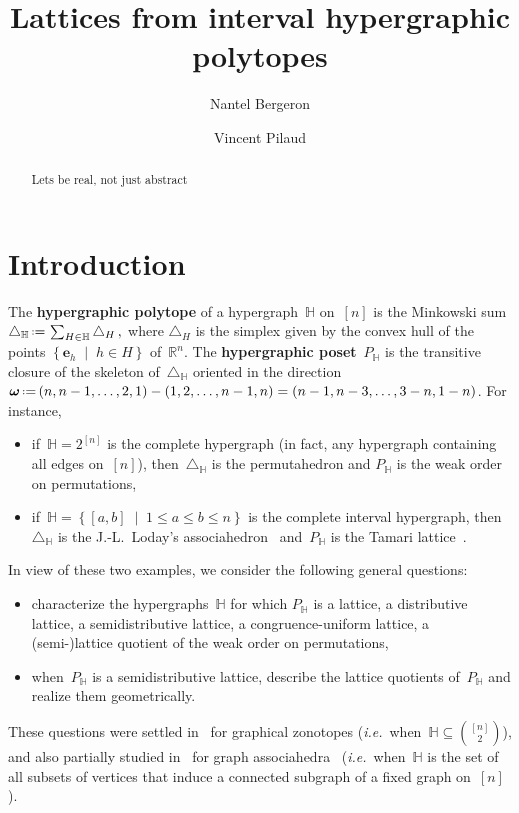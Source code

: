 \documentclass[reqno]{amsart}
\title{Lattices from interval hypergraphic polytopes}
\author[N.~Bergeron]{Nantel Bergeron}
\author{Vincent Pilaud}
\theoremstyle{definition}
\newcommand{\R}{\mathbb{R}} %
\renewcommand{\b}[1]{\boldsymbol{#1}} %
\newcommand{\set}[2]{\left\{ #1 \;\middle|\; #2 \right\}} %
\newcommand{\eqdef}{\mbox{\,\raisebox{0.2ex}{\scriptsize\ensuremath{\mathrm:}}\ensuremath{=}\,}} %
\newcommand{\simplex}{\triangle} %
\newcommand{\ie}{\textit{i.e.}~} %
\newcommand{\defn}[1]{\textbf{\textsf{\color{PineGreen} #1}}} %
\newcommand{\HH}{\mathbb H}  %
\begin{document}
\begin{abstract}
	Lets be real, not just abstract
\end{abstract}

\vspace*{-.8cm}

\maketitle

\tableofcontents


\section{Introduction}
\label{sec:introduction}

The \defn{hypergraphic polytope} of a hypergraph~$\HH$ on~$[n]$ is the Minkowski sum
\(
\simplex_\HH \eqdef \sum_{H\in \HH} \simplex_H\,,
\)
where $\simplex_H$ is the simplex given by the convex hull of the points $\set{\b{e}_h}{h \in H}$ of~$\R^n$.
The \defn{hypergraphic poset}~$P_\HH$ is the transitive closure of the skeleton of~$\triangle_\HH$ oriented in the direction~$\b{\omega} \eqdef (n, n-1, \dots, 2, 1) - (1, 2, \dots, n-1, n) = (n-1, n-3, \dots, 3-n, 1-n)$.
For instance, 
\begin{itemize}
\item if~$\HH = 2^{[n]}$ is the complete hypergraph (in fact, any hypergraph containing all edges on~$[n]$), then~$\triangle_\HH$ is the permutahedron and $P_\HH$ is the weak order on permutations,
\item if~$\HH = \set{[a,b]}{1 \le a \le b \le n}$ is the complete interval hypergraph, then~$\triangle_\HH$ is the J.-L.~Loday's associahedron~\cite{ShniderSternberg,Loday} and~$P_\HH$ is the Tamari lattice~\cite{Tamari}.
\end{itemize}
In view of these two examples, we consider the following general questions:
\begin{itemize}
\item characterize the hypergraphs~$\HH$ for which $P_\HH$ is a lattice, a distributive lattice, a semidistributive lattice, a congruence-uniform lattice, a (semi-)lattice quotient of the weak order on permutations,
\item when~$P_\HH$ is a semidistributive lattice, describe the lattice quotients of~$P_\HH$ and realize them geometrically.
\end{itemize}
These questions were settled in~\cite{Pilaud-acyclicReorientationLattices} for graphical zonotopes (\ie when~$\HH \subseteq \binom{[n]}{2}$), and also partially studied in~\cite{BarnardMcConville} for graph associahedra~\cite{CarrDevadoss} (\ie when~$\HH$ is the set of all subsets of vertices that induce a connected subgraph of a fixed graph on~$[n]$).
\end{document}
